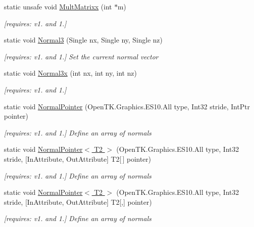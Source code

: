 \begin{DoxyCompactItemize}
static unsafe void \hyperlink{class_open_t_k_1_1_graphics_1_1_e_s10_1_1_g_l_a4f339476e10f7ce99cac836fd61844af}{Mult\-Matrixx} (int $\ast$m)
\begin{DoxyCompactList}\small\item\em \mbox{[}requires\-: v1. and 1.\mbox{]}\end{DoxyCompactList}\item 
static void \hyperlink{class_open_t_k_1_1_graphics_1_1_e_s10_1_1_g_l_a5a78199f22585c18d569a91acdfc706e}{Normal3} (Single nx, Single ny, Single nz)
\begin{DoxyCompactList}\small\item\em \mbox{[}requires\-: v1. and 1.\mbox{]} Set the current normal vector \end{DoxyCompactList}\item 
static void \hyperlink{class_open_t_k_1_1_graphics_1_1_e_s10_1_1_g_l_a41e7d3cfdbd7c7cdd7314d15d496d52f}{Normal3x} (int nx, int ny, int nz)
\begin{DoxyCompactList}\small\item\em \mbox{[}requires\-: v1. and 1.\mbox{]}\end{DoxyCompactList}\item 
static void \hyperlink{class_open_t_k_1_1_graphics_1_1_e_s10_1_1_g_l_a0d7c96e919dae4ef3f15a1aa30fbf9f5}{Normal\-Pointer} (Open\-T\-K.\-Graphics.\-E\-S10.\-All type, Int32 stride, Int\-Ptr pointer)
\begin{DoxyCompactList}\small\item\em \mbox{[}requires\-: v1. and 1.\mbox{]} Define an array of normals \end{DoxyCompactList}\item 
static void \hyperlink{class_open_t_k_1_1_graphics_1_1_e_s10_1_1_g_l_a0411a9c673884cf2d4aa166bbe03b380}{Normal\-Pointer$<$ T2 $>$} (Open\-T\-K.\-Graphics.\-E\-S10.\-All type, Int32 stride, \mbox{[}In\-Attribute, Out\-Attribute\mbox{]} T2\mbox{[}$\,$\mbox{]} pointer)
\begin{DoxyCompactList}\small\item\em \mbox{[}requires\-: v1. and 1.\mbox{]} Define an array of normals \end{DoxyCompactList}\item 
static void \hyperlink{class_open_t_k_1_1_graphics_1_1_e_s10_1_1_g_l_a5e49605d1063900b80b7b3015bd17713}{Normal\-Pointer$<$ T2 $>$} (Open\-T\-K.\-Graphics.\-E\-S10.\-All type, Int32 stride, \mbox{[}In\-Attribute, Out\-Attribute\mbox{]} T2\mbox{[},\mbox{]} pointer)
\begin{DoxyCompactList}\small\item\em \mbox{[}requires\-: v1. and 1.\mbox{]} Define an array of normals \end{DoxyCompactList}\item 

\end{DoxyCompactItemize}
